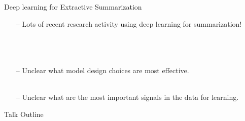 \begin{frame}{Deep learning for Extractive Summarization}

  \begin{itemize}
    \item[--] Lots of recent research activity using deep learning for 
              summarization!  \\
              ~\\
              ~\\
              ~\\
    \item[--] Unclear what model design choices are most effective.\\
              ~\\
    \item[--] Unclear what are the most important signals in the data for 
              learning.\\
  \end{itemize}
  
\end{frame}


\begin{frame}{Talk Outline}
  \tableofcontents
\end{frame}
